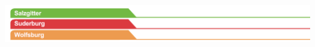 \begin{titlepage}
	\vspace{2em}
	
	
	\enlargethispage{10\baselineskip}
	
	\includegraphics[scale=1.20]{Bilder/reiter_szsudwob_174mm.jpg}
	
\end{titlepage}

\restoregeometry
